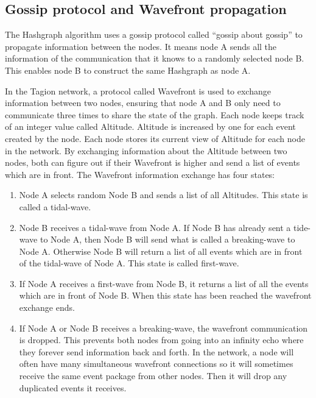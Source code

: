 \subsection{Gossip protocol and Wavefront propagation}
The Hashgraph algorithm uses a gossip protocol called “gossip about gossip” to propagate information between the nodes. It means node A sends all the information of the communication that it knows to a randomly selected node B. This enables node B to construct the same Hashgraph as node A.

In the Tagion network, a protocol called Wavefront is used to exchange information between two nodes, ensuring that node A and B only need to communicate three times to share the state of the graph.
Each node keeps track of an integer value called Altitude. Altitude is increased by one for each event created by the node. Each node stores its current view of Altitude for each node in the network.
By exchanging information about the Altitude between two nodes, both can figure out if their Wavefront is higher and send a list of events which are in front.
The Wavefront information exchange has four states:

\begin{enumerate}
 \item 
 Node A selects random Node B and sends a list of all Altitudes. This state is called a tidal-wave.
 \item 
 Node B receives a tidal-wave from Node A. If Node B has already sent a tide-wave to Node A, then Node B will send what is called a breaking-wave to Node A. Otherwise Node B will return a list of all events which are in front of the tidal-wave of Node A. This state is called first-wave.
 \item 
 If Node A receives a first-wave from Node B, it returns a list of all the events which are in front of Node B. When this state has been reached the wavefront exchange ends.
 \item 
 If Node A or Node B receives a breaking-wave, the wavefront communication is dropped. This prevents both nodes from going into an infinity echo where they forever send information back and forth.
In the network, a node will often have many simultaneous wavefront connections so it will sometimes receive the same event package from other nodes. Then it will drop any duplicated events it receives.  
\end{enumerate}

